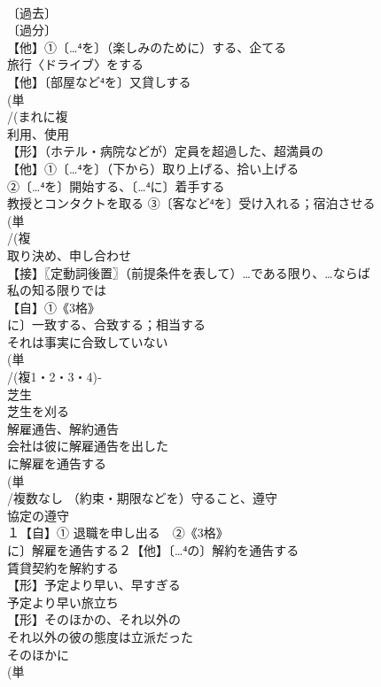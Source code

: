 \documentclass[8pt]{extreport}
\begin{document}
\begin{CJK}{UTF8}{min}
\\	〔過去〕
\\	〔過分〕
\\	【他】①〔…⁴を〕（楽しみのために）する、企てる 
\\	旅行〈ドライブ〉をする 
\\	【他】〔部屋など⁴を〕又貸しする 
\\	(単
\\	/(まれに複
\\	利用、使用 
\\	【形】（ホテル・病院などが）定員を超過した、超満員の
\\	【他】①〔…⁴を〕（下から）取り上げる、拾い上げる 
\\	②〔…⁴を〕開始する、〔…⁴に〕着手する 
\\	教授とコンタクトを取る ③〔客など⁴を〕受け入れる；宿泊させる
\\	(単
\\	/(複
\\	取り決め、申し合わせ 
\\	【接】〖定動詞後置〗（前提条件を表して）…である限り、…ならば 
\\	私の知る限りでは
\\	【自】①《3格》
\\	に〕一致する、合致する；相当する 
\\	それは事実に合致していない
\\	(単
\\	/(複1・2・3・4)‐ 
\\	芝生 
\\	芝生を刈る
\\	解雇通告、解約通告 
\\	会社は彼に解雇通告を出した 
\\	に解雇を通告する
\\	(単
\\	/複数なし （約束・期限などを）守ること、遵守 
\\	協定の遵守
\\	１【自】① 退職を申し出る　②《3格》
\\	に〕解雇を通告する２【他】〔…⁴の〕解約を通告する 
\\	賃貸契約を解約する
\\	【形】予定より早い、早すぎる 
\\	予定より早い旅立ち 
\\	【形】そのほかの、それ以外の 
\\	それ以外の彼の態度は立派だった 
\\	そのほかに
\\	(単

\end{CJK}
\end{document}
